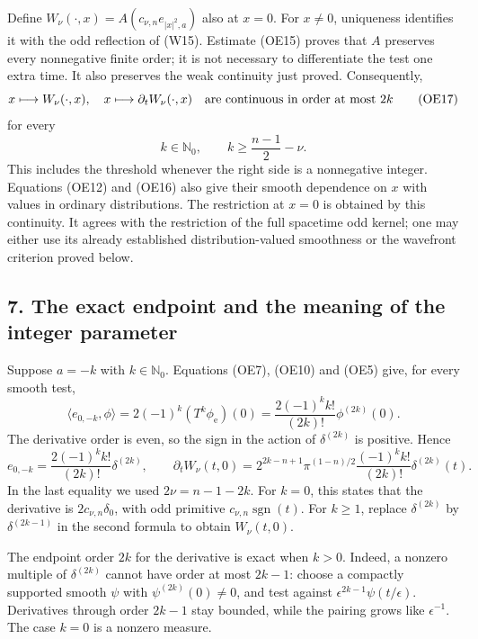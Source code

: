 \documentclass[
  11pt,
]{article}
\begin{document}
Define \(W_\nu(\cdot,x)=A(c_{\nu,n}e_{|x|^2,a})\) also at \(x=0\). For
\(x\ne0\), uniqueness identifies it with the odd reflection of (W15).
Estimate (OE15) proves that \(A\) preserves every nonnegative finite
order; it is not necessary to differentiate the test one extra time. It
also preserves the weak continuity just proved. Consequently, \[
 x\longmapsto W_\nu(\cdot,x),\quad
 x\longmapsto\partial_tW_\nu(\cdot,x)
 \quad\hbox{are continuous in order at most }2k
 \tag{OE17}
\] for every \[
 k\in\mathbb N_0,\qquad k\geq\frac{n-1}{2}-\nu.
 \tag{OE18}
\] This includes the threshold whenever the right side is a nonnegative
integer. Equations (OE12) and (OE16) also give their smooth dependence
on \(x\) with values in ordinary distributions. The restriction at
\(x=0\) is obtained by this continuity. It agrees with the restriction
of the full spacetime odd kernel; one may either use its already
established distribution-valued smoothness or the wavefront criterion
proved below.

\subsection{7. The exact endpoint and the meaning of the integer
parameter}\label{the-exact-endpoint-and-the-meaning-of-the-integer-parameter}

Suppose \(a=-k\) with \(k\in\mathbb N_0\). Equations (OE7), (OE10) and
(OE5) give, for every smooth test, \[
 \langle e_{0,-k},\phi\rangle
   =2(-1)^k(T^k\phi_{\mathrm e})(0)
   =\frac{2(-1)^kk!}{(2k)!}\phi^{(2k)}(0).
\] The derivative order is even, so the sign in the action of
\(\delta^{(2k)}\) is positive. Hence \[
 e_{0,-k}=\frac{2(-1)^kk!}{(2k)!}\delta^{(2k)},
 \qquad
 \partial_tW_\nu(t,0)
 =2^{2k-n+1}\pi^{(1-n)/2}
       \frac{(-1)^kk!}{(2k)!}\delta^{(2k)}(t).
 \tag{OE19}
\] In the last equality we used \(2\nu=n-1-2k\). For \(k=0\), this
states that the derivative is \(2c_{\nu,n}\delta_0\), with odd primitive
\(c_{\nu,n}\operatorname{sgn}(t)\). For \(k\geq1\), replace
\(\delta^{(2k)}\) by \(\delta^{(2k-1)}\) in the second formula to obtain
\(W_\nu(t,0)\).

The endpoint order \(2k\) for the derivative is exact when \(k>0\).
Indeed, a nonzero multiple of \(\delta^{(2k)}\) cannot have order at
most \(2k-1\): choose a compactly supported smooth \(\psi\) with
\(\psi^{(2k)}(0)\ne0\), and test against
\(\epsilon^{2k-1}\psi(t/\epsilon)\). Derivatives through order \(2k-1\)
stay bounded, while the pairing grows like \(\epsilon^{-1}\). The case
\(k=0\) is a nonzero measure.
\end{document}
